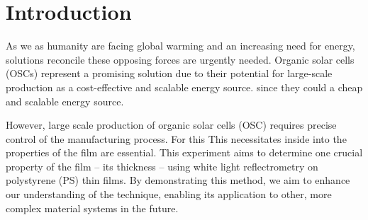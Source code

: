 

\chapter{Introduction}
\label{chap:einleitung}

As we as humanity are facing global warming and an increasing need for energy, solutions reconcile these opposing forces are urgently needed. Organic solar cells (OSCs) represent a promising solution due to their potential for large-scale production as a cost-effective and scalable energy source.
since they could a cheap and scalable energy source.

However, large scale production of organic solar cells (OSC) requires precise control of the manufacturing process. For this 
This necessitates inside into the properties of the film are essential. This experiment aims to determine one crucial property of the film -- its thickness -- using white light reflectrometry on polystyrene (PS) thin films.  By demonstrating this method, we aim to enhance our understanding of the technique, enabling its application to other, more complex material systems in the future.


